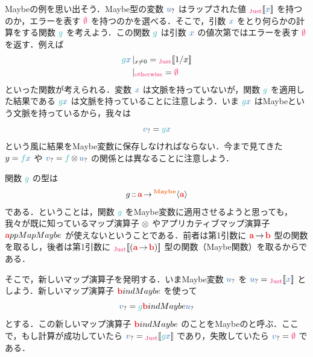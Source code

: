 \documentclass[a5paper,twoside,fleqn,draft]{jsbook}
\begin{document}
Maybeの例を思い出そう．Maybe型の変数 $\hMaybeVar{u}$ はラップされた値 $\hJustWith{\hVar{x}}$ を持つのか，エラーを表す $\hNothing$ を持つのかを選べる．そこで，引数 $\hVar{x}$ をとり何らかの計算をする関数 $\hFunc{g}$ を考えよう．この関数 $\hFunc{g}$ は引数 $\hVar{x}$ の値次第ではエラーを表す $\hNothing$ を返す．例えば
\begin{equation}
  \begin{aligned}
    \hFunc{g}\hVar{x}&\hGuard{x\neq0}=\hJustWith{1/x}\\
    &\hGuard{\hOtherwise}=\hNothing
  \end{aligned}
\end{equation}
といった関数が考えられる．変数 $\hVar{x}$ は文脈を持っていないが，関数 $\hFunc{g}$ を適用した結果である $\hFunc{g}\hVar{x}$ は文脈を持っていることに注意しよう．いま $\hFunc{g}\hVar{x}$ はMaybeという文脈を持っているから，我々は
\begin{equation}
\hMaybeVar{v}=\hFunc{g}\hVar{x}
\end{equation}
という風に結果をMaybe変数に保存しなければならない．今まで見てきた $y=\hFunc{f}\hVar{x}$ や $\hMaybeVar{v}=\hFunc{f}\hFunctorMap\hMaybeVar{u}$ の関係とは異なることに注意しよう．

関数 $\hFunc{g}$ の型は
\begin{equation}
  g\hIsTypeOf\mProjEXP{\hTypeName{a} }{\hMaybeConstruct{\hTypeName{a}}}
\end{equation}
である．ということは，関数 $\hFunc{g}$ をMaybe変数に適用させるようと思っても，我々が既に知っているマップ演算子 $\operatorname{\otimes}$ やアプリカティブマップ演算子 $\hTypeName{a}ppMapMaybe$ が使えないということである．前者は第1引数に $\mProjEXP{\hTypeName{a} }{\hTypeName{b} }$ 型の関数を取るし，後者は第1引数に $\hJustWith{(\mProjEXP{\hTypeName{a} }{\hTypeName{b} })}$ 型の関数（Maybe関数）を取るからである．


そこで，新しいマップ演算子を発明する．いまMaybe変数 $\hMaybeVar{u}$ を $\hMaybeVar{u}=\hJustWith{\hVar{x}}$ としよう．新しいマップ演算子 $\hTypeName{b}indMaybe$ を使って
\begin{equation}
  \hMaybeVar{v}=\hFunc{g}\hTypeName{b}indMaybe\hMaybeVar{u}
\end{equation}
とする．この新しいマップ演算子 $\hTypeName{b}indMaybe$ のことをMaybeのと呼ぶ．ここで，もし計算が成功していたら $\hMaybeVar{v}=\hJustWith{\hFunc{g}\hVar{x}}$ であり，失敗していたら $\hMaybeVar{v}=\hNothing$ である．
\end{document}
